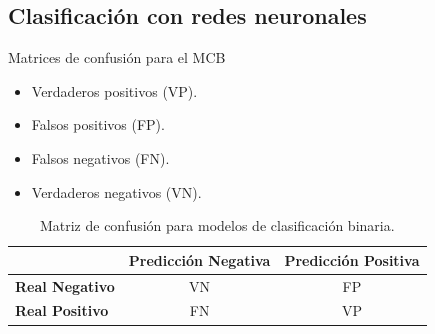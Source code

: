 \subsection{Clasificación con redes neuronales}
\begin{frame}{Matrices de confusión para el MCB}
\begin{itemize}
	\item \small Verdaderos positivos (VP).
    \item \small Falsos positivos (FP).
    \item \small Falsos negativos (FN).
    \item \small Verdaderos negativos (VN).
\end{itemize}

\begin{table}[H]
\centering
\begin{tabular}{|l|c|c|}
\hline
 & \textbf{Predicción Negativa} & \textbf{Predicción Positiva} \\ \hline
\textbf{Real Negativo} & VN & FP \\ \hline
\textbf{Real Positivo} & FN & VP \\ \hline
\end{tabular}
\caption{Matriz de confusión para modelos de clasificación binaria.}
\label{tab:confusion_matrix}
\end{table}

\scriptsize
{}



\end{frame}

